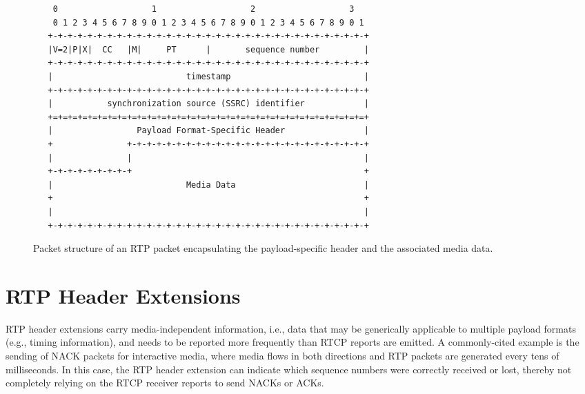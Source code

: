 \begin{figure}[!t]
\begin{spacing}{0.5}
{\footnotesize
\begin{verbatim}
    0                   1                   2                   3
    0 1 2 3 4 5 6 7 8 9 0 1 2 3 4 5 6 7 8 9 0 1 2 3 4 5 6 7 8 9 0 1
   +-+-+-+-+-+-+-+-+-+-+-+-+-+-+-+-+-+-+-+-+-+-+-+-+-+-+-+-+-+-+-+-+
   |V=2|P|X|  CC   |M|     PT      |       sequence number         |
   +-+-+-+-+-+-+-+-+-+-+-+-+-+-+-+-+-+-+-+-+-+-+-+-+-+-+-+-+-+-+-+-+
   |                           timestamp                           |
   +-+-+-+-+-+-+-+-+-+-+-+-+-+-+-+-+-+-+-+-+-+-+-+-+-+-+-+-+-+-+-+-+
   |           synchronization source (SSRC) identifier            |
   +=+=+=+=+=+=+=+=+=+=+=+=+=+=+=+=+=+=+=+=+=+=+=+=+=+=+=+=+=+=+=+=+
   |                 Payload Format-Specific Header                |
   +               +-+-+-+-+-+-+-+-+-+-+-+-+-+-+-+-+-+-+-+-+-+-+-+-+
   |               |                                               |
   +-+-+-+-+-+-+-+-+                                               +
   |                           Media Data                          |
   +                                                               +
   |                                                               |
   +-+-+-+-+-+-+-+-+-+-+-+-+-+-+-+-+-+-+-+-+-+-+-+-+-+-+-+-+-+-+-+-+
\end{verbatim}
}
\end{spacing}
\caption{Packet structure of an RTP packet encapsulating the
payload-specific header and the associated media data.}
\label{fig:3:pt.fmt}
\end{figure}


\section{RTP Header Extensions}

RTP header extensions carry media-independent information, i.e., data that may
be generically applicable to multiple payload formats (e.g., timing
information), and needs to be reported more frequently than RTCP reports are
emitted. A commonly-cited example is the sending of NACK packets for interactive media,
where media flows in both directions and RTP packets are generated every tens
of milliseconds. In this case, the RTP header extension can indicate which sequence numbers
were correctly received or lost, thereby not completely relying on the RTCP
receiver reports to send NACKs or ACKs.

